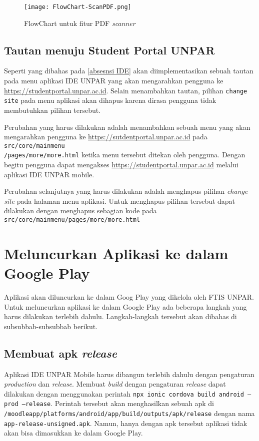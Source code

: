 \begin{figure}[H] 
	\centering  
	\texttt{[image: FlowChart-ScanPDF.png]}  
	\caption[FlowChart untuk fitur PDF \textit{scanner}] {FlowChart untuk fitur PDF \textit{scanner}} 
	\label{fig:scan:flowchart} 
\end{figure} 

\subsection{Tautan menuju Student Portal UNPAR}
\label{feat:menu:link}
Seperti yang dibahas pada \ref{absesnsi IDE} akan diimplementasikan sebuah tautan pada menu aplikasi IDE UNPAR yang akan mengarahkan pengguna ke \url{https://studentportal.unpar.ac.id}. Selain menambahkan tautan, pilihan \texttt{change site} pada menu aplikasi akan dihapus karena dirasa pengguna tidak membutuhkan pilihan tersebut.

Perubahan yang harus dilakukan adalah menambahkan sebuah menu yang akan mengarahkan pengguna ke \url{https://sutdentportal.unpar.ac.id} pada \texttt{src/core/mainmenu\\/pages/more/more.html} ketika menu tersebut ditekan oleh pengguna. Dengan begitu pengguna dapat mengakses \url{https://studentportal.unpar.ac.id} melalui aplikasi IDE UNPAR mobile.

Perubahan selanjutnya yang harus dilakukan adalah menghapus pilihan \textit{change site} pada halaman menu aplikasi. Untuk menghapus pilihan tersebut dapat dilakukan dengan menghapus sebagian kode pada \texttt{src/core/mainmenu/pages/more/more.html}

\section{Meluncurkan Aplikasi ke dalam Google Play}
\label{apk:release}
Aplikasi akan diluncurkan ke dalam Goog Play yang dikelola oleh FTIS UNPAR. Untuk meluncurkan aplikasi ke dalam Google Play ada beberapa langkah yang harus dilakukan terlebih dahulu. Langkah-langkah tersebut akan dibahas di subsubbab-subsubbab berikut.

\subsection{Membuat apk \textit{release}}

Aplikasi IDE UNPAR Mobile harus dibangun terlebih dahulu dengan pengaturan \textit{production} dan \textit{release}. Membuat \textit{build} dengan pengaturan \textit{release} dapat dilakukan dengan menggunakan perintah \texttt{npx ionic cordova build android --prod --release}. Perintah tersebut akan menghasilkan sebuah apk di \texttt{/moodleapp/platforms/android/app/build/outputs/apk/release} dengan nama \texttt{app-release-unsigned.apk}. Namun, hanya dengan apk tersebut aplikasi tidak akan bisa dimasukkan ke dalam Google Play.

